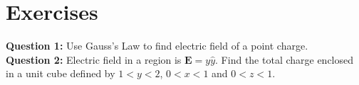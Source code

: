 \documentclass[12pt,a4paper]{article}
\begin{document}
\section{Exercises}
\noindent\textbf{Question 1:} Use Gauss's Law to find electric field of a point charge.\\[0.2cm]
\noindent\textbf{Question 2:} Electric field in a region is $\textbf{E}=y\hat y$. Find the total charge enclosed in a unit cube defined by $1<y<2$, $0<x<1$ and $0<z<1$.
%
%
\end{document}
